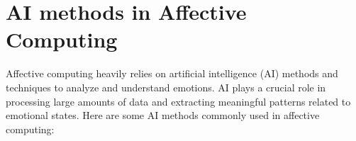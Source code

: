 \section{AI methods in Affective Computing}
Affective computing heavily relies on artificial intelligence (AI) methods and techniques to analyze and understand emotions. 
AI plays a crucial role in processing large amounts of data and extracting meaningful patterns related to emotional states. 
Here are some AI methods commonly used in affective computing:





